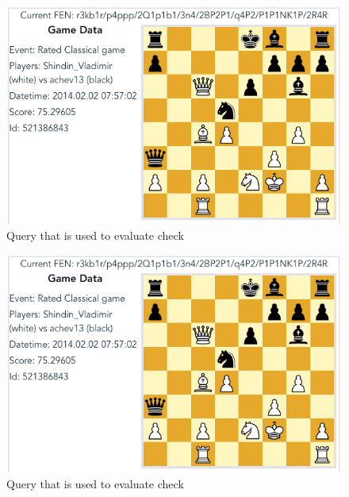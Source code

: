 \documentclass[11pt]{article}
\begin{document}
    \begin{figure}[H]
        \centering
        \includegraphics[width=14cm]{images/BlackCheck1-BoReAtDeCh}
        \caption{Query that is used to evaluate check}
        \label{fig:BlackCheck1-BoReAtDeCh}
    \end{figure}

    \begin{figure}[H]
        \centering
        \includegraphics[width=14cm]{images/BlackCheck1-BoReAtDeCh}
        \caption{Query that is used to evaluate check}
        \label{fig:BlackCheck2-BoReAtDeCh}
    \end{figure}



\end{document}

